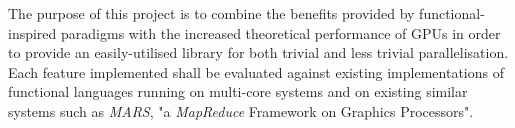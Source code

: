 The purpose of this project is to combine the benefits provided by functional-inspired paradigms with the increased theoretical performance of \ac{GPUs} in order to provide an easily-utilised library for both trivial and less trivial parallelisation. Each feature implemented shall be evaluated against existing implementations of functional languages running on multi-core systems and on existing similar systems such as \emph{MARS}, "a \emph{MapReduce} Framework on Graphics Processors".
